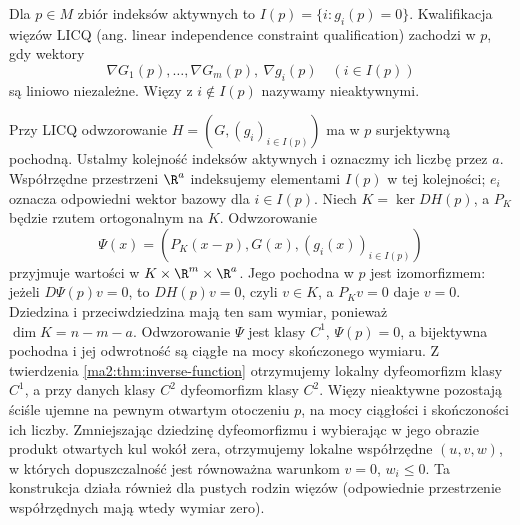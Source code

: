 \begin{definicja}
\label{ma2:def:licq}
Dla $p\in M$ zbiór indeksów aktywnych to
$I(p)=\{i:g_i(p)=0\}$. Kwalifikacja więzów LICQ
(ang. linear independence constraint qualification)
zachodzi w $p$, gdy wektory
\[
 \nabla G_1(p),\ldots,\nabla G_m(p),\
 \nabla g_i(p)\quad(i\in I(p))
\]
są liniowo niezależne. Więzy z $i\notin I(p)$
nazywamy nieaktywnymi.
\end{definicja}

Przy LICQ odwzorowanie $H=(G,(g_i)_{i\in I(p)})$
ma w $p$ surjektywną pochodną. Ustalmy kolejność indeksów aktywnych i oznaczmy ich
liczbę przez $a$. Współrzędne przestrzeni $\R^a$
indeksujemy elementami $I(p)$ w tej kolejności;
$e_i$ oznacza odpowiedni wektor bazowy dla $i\in I(p)$.
Niech $K=\ker DH(p)$, a $P_K$ będzie rzutem
ortogonalnym na $K$. Odwzorowanie
\[
 \Psi(x)=(P_K(x-p),G(x),(g_i(x))_{i\in I(p)})
\]
przyjmuje wartości w $K\times\R^m\times\R^a$.
Jego pochodna w $p$ jest izomorfizmem:
jeżeli $D\Psi(p)v=0$, to $DH(p)v=0$, czyli $v\in K$,
a $P_Kv=0$ daje $v=0$. Dziedzina i przeciwdziedzina
mają ten sam wymiar, ponieważ $\dim K=n-m-a$.
Odwzorowanie $\Psi$ jest klasy $C^1$, $\Psi(p)=0$,
a bijektywna pochodna i jej odwrotność są ciągłe
na mocy skończonego wymiaru. Z twierdzenia
\ref{ma2:thm:inverse-function}
otrzymujemy lokalny dyfeomorfizm klasy $C^1$,
a przy danych klasy $C^2$ dyfeomorfizm klasy $C^2$.
Więzy nieaktywne pozostają ściśle ujemne na pewnym
otwartym otoczeniu $p$, na mocy ciągłości i skończoności
ich liczby. Zmniejszając dziedzinę dyfeomorfizmu
i wybierając w jego obrazie produkt otwartych kul
wokół zera, otrzymujemy lokalne współrzędne $(u,v,w)$,
w których dopuszczalność jest równoważna warunkom
$v=0$, $w_i\le0$. Ta konstrukcja działa również
dla pustych rodzin więzów (odpowiednie przestrzenie
współrzędnych mają wtedy wymiar zero).

